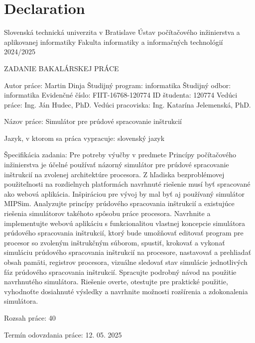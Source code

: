 \thispagestyle{empty}
\section*{Declaration}

Slovenská technická univerzita v Bratislave
Ústav počítačového inžinierstva a aplikovanej informatiky		Fakulta informatiky a informačných technológií
2024/2025




ZADANIE BAKALÁRSKEJ PRÁCE


Autor práce:	Martin Dinja
Študijný program:	informatika
Študijný odbor:	informatika
Evidenčné číslo:	FIIT-16768-120774
ID študenta:	120774
Vedúci práce:	Ing. Ján Hudec, PhD.
Vedúci pracoviska:	Ing. Katarína Jelemenská, PhD.

Názov práce:	
Simulátor pre prúdové spracovanie inštrukcií

Jazyk, v ktorom sa práca vypracuje:	
slovenský jazyk

Špecifikácia zadania:	
Pre potreby výučby v predmete Princípy počítačového inžinierstva je účelné používať názorný simulátor pre prúdové spracovanie inštrukcií na zvolenej architektúre procesora. Z hľadiska bezproblémovej použiteľnosti na rozdielnych platformách navrhnuté riešenie musí byť spracované ako webová aplikácia. Inšpiráciou pre vývoj by mal byť aj používaný simulátor MIPSim. Analyzujte princípy prúdového spracovania inštrukcií a existujúce riešenia simulátorov takéhoto spôsobu práce procesora. Navrhnite a implementujte webovú aplikáciu s funkcionalitou vlastnej koncepcie simulátora prúdového spracovania inštrukcií, ktorý bude umožňovať editovať program pre procesor so zvoleným inštrukčným súborom, spustiť, krokovať a vykonať simuláciu prúdového spracovania inštrukcií na procesore, nastavovať a prehliadať obsah pamäti, registrov procesora, vizuálne sledovať stav simulácie jednotlivých fáz prúdového spracovania inštrukcií. Spracujte podrobný návod na použitie navrhnutého simulátora. Riešenie overte, otestujte pre praktické použitie, vyhodnoťte dosiahnuté výsledky a navrhnite možnosti rozšírenia a zdokonalenia simulátora.

Rozsah práce:	
40

Termín odovzdania práce:	
12. 05. 2025
\newpage
\thispagestyle{empty}
\mbox{}
\newpage